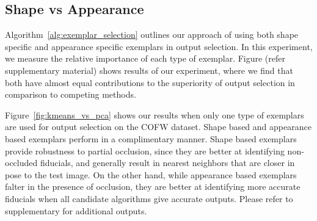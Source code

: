  
\subsection{Shape vs Appearance}
\label{subsec:shape_vs_appearance}
Algorithm~\ref{alg:exemplar_selection} outlines our approach of using both shape specific and
appearance specific exemplars in output selection. In this experiment, we measure the relative
importance of each type of exemplar. Figure (refer supplementary material) shows results of our
experiment, where we find that both have almost equal contributions to the superiority of 
output selection in comparison to competing methods.
 
Figure~\ref{fig:kmeans_vs_pca} shows our results when only one type of exemplars are used
for output selection on the COFW dataset. Shape based and appearance based exemplars perform in a complimentary manner.
Shape based exemplars provide robustness to partial occlusion, since they are better at identifying
non-occluded fiducials, and generally result in nearest neighbors that are closer in pose to the
test image. On the other hand, while appearance based exemplars falter in the presence of occlusion,
they are better at identifying more accurate fiducials when all candidate algorithms give accurate outputs.
Please refer to supplementary for additional outputs.

